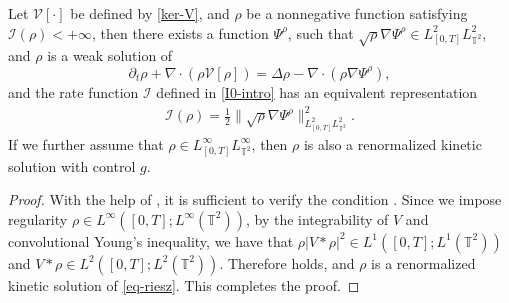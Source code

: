 \begin{lem}\label{ske-lem}
Let $\mathcal{V}[\cdot]$ be defined by \eqref{ker-V}, and $\rho$ be a nonnegative function satisfying $\mathcal{I}(\rho)<+\infty$, then there
exists a function $\Psi^{\rho}$, such that $\sqrt{\rho}\nabla\Psi^{\rho} \in L^2_{[0,T]}L^2_{\mathbb{T}^2}$, and $\rho$ is a weak solution of 
\begin{equation}\label{eq-riesz}
\partial_t\rho+\nabla\cdot(\rho \mathcal{V}[\rho])=\Delta\rho-\nabla\cdot(\rho\nabla\Psi^{\rho}),
\end{equation}
and the rate function $\mathcal{I}$ defined in \eqref{I0-intro} has an equivalent representation
\begin{align}\label{RF low}
\mathcal{I}(\rho)=\frac{1}{2}\|\sqrt{\rho}\nabla\Psi^{\rho}\|_{L_{[0,T]}^2L^2_{\mathbb{T}^2}}^2.
\end{align}
If we further assume that $\rho \in L^\infty_{[0,T]}L^\infty_{\mathbb{T}^2}$,  then $\rho$ is also a renormalized kinetic solution with control $g$. 
\end{lem}
\begin{proof}
With the help of \cite[Theorem 3.5]{WZ24}, it is sufficient to verify the condition \cite[(3.22)]{WZ24}. Since we impose regularity $\rho\in L^\infty([0,T];L^\infty(\mathbb{T}^2))$, by the integrability of $V$ and convolutional Young's inequality, we have that $\rho|V\ast\rho|^2\in L^1([0,T];L^1(\mathbb{T}^2))$ and $V\ast\rho\in L^2([0,T];L^2(\mathbb{T}^2))$. Therefore \cite[(3.22)]{WZ24} holds, and $\rho$ is a renormalized kinetic solution of \eqref{eq-riesz}. This completes the proof. 
	
\end{proof}

